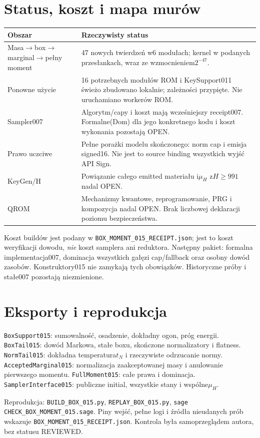 \documentclass[11pt,a4paper]{article}
\newcommand{\code}[1]{\nolinkurl{#1}}
\begin{document}
\section{Status, koszt i mapa murów}
\begin{longtable}{p{.28\linewidth}p{.65\linewidth}}
\toprule Obszar & Rzeczywisty status\\\midrule
Masa$\to$box$\to$marginal$\to$pełny moment & 47 nowych twierdzeń w6 modułach;
  kernel w podanych przesłankach, wraz ze wzmocnieniem$2^{-47}$.\\
Ponowne użycie & 16 potrzebnych modułów ROM i KeySupport011 świeżo
  zbudowano lokalnie; zależności przypięte. Nie uruchamiano workerów ROM.\\
Sampler007 & Algorytm/capy i koszt mają wcześniejszy receipt007.
  Formalne(Dom) dla jego konkretnego kodu i koszt wykonania pozostają OPEN.\\
Prawo uczciwe & Pełne porażki modelu skończonego: norm cap i emisja signed16.
  Nie jest to source binding wszystkich wyjść API Sign.\\
KeyGen/H & Powiązanie całego emitted materiału i$\mu_H$ z$H\ge991$ nadal OPEN.\\
QROM & Mechanizmy kwantowe, reprogramowanie, PRG i kompozycja nadal OPEN.
  Brak liczbowej deklaracji poziomu bezpieczeństwa.\\
\bottomrule
\end{longtable}
Koszt buildów jest podany w \code{BOX_MOMENT_015_RECEIPT.json}; jest to koszt
weryfikacji dowodu, \emph{nie} koszt samplera ani reduktora.
Następny pakiet: formalna implementacja007, dominacja wszystkich gałęzi
cap/fallback oraz osobny dowód zasobów. Konstruktory015 nie zamykają tych
obowiązków. Historyczne próby i stałe007 pozostają niezmienione.

\appendix\section{Eksporty i reprodukcja}
\code{BoxSupport015}: sumowalność, osadzenie, dokładny ogon, próg energii.
\code{BoxTail015}: dowód Markowa, stałe boxu, skończone normalizatory i flatness.
\code{NormTail015}: dokładna temperatura$t_N$ i rzeczywiste odrzucanie normy.
\code{AcceptedMarginal015}: normalizacja zaakceptowanej masy i anulowanie
pierwszego momentu. \code{FullMoment015}: całe prawa i dominacja.
\code{SamplerInterface015}: publiczne initial, wszystkie stany i wspólne$\mu_H$.

Reprodukcja: \code{BUILD_BOX_015.py}, \code{REPLAY_BOX_015.py},
\code{sage CHECK_BOX_MOMENT_015.sage}. Piny wejść, pełne logi i źródła
nieudanych prób wskazuje \code{BOX_MOMENT_015_RECEIPT.json}.
Kontrola była samoprzeglądem autora, bez statusu REVIEWED.
\end{document}

